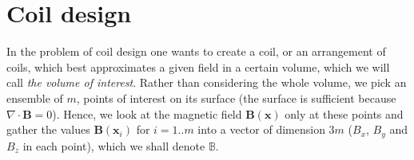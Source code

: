 

%


\section{Coil design}
In the problem of coil design one wants to create a coil, or an arrangement of coils, which best approximates a given field in a certain volume, which we will call \emph{the volume of interest}. Rather than considering the whole volume, we pick an ensemble of $m$, points of interest on its surface (the surface is sufficient because $\nabla \cdot \mathbf{B} = 0$). Hence, we look at the magnetic field $\mathbf{B}(\mathbf{x})$ only at these points and gather the values $\mathbf{B}(\mathbf{x}_i)$ for $i = 1 .. m$ into a vector of dimension $3m$ ($B_x$, $B_y$ and $B_z$ in each point), which we shall denote $\mathbb{B}$.


